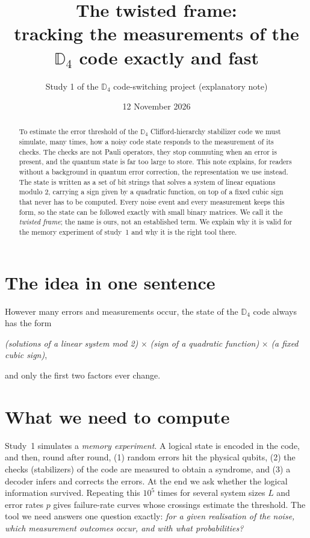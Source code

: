 \documentclass[11pt,a4paper]{article}
\title{The twisted frame:\\ tracking the measurements of the $\mathbb{D}_4$ code exactly and fast}
\author{Study 1 of the $\mathbb{D}_4$ code-switching project (explanatory note)}
\date{12 November 2026}
\begin{document}
\maketitle

\begin{abstract}
To estimate the error threshold of the $\mathbb{D}_4$ Clifford-hierarchy stabilizer code we must simulate, many times, how a noisy code state responds to the measurement of its checks. The checks are not Pauli operators, they stop commuting when an error is present, and the quantum state is far too large to store. This note explains, for readers without a background in quantum error correction, the representation we use instead. The state is written as a set of bit strings that solves a system of linear equations modulo 2, carrying a sign given by a quadratic function, on top of a fixed cubic sign that never has to be computed. Every noise event and every measurement keeps this form, so the state can be followed exactly with small binary matrices. We call it the \emph{twisted frame}; the name is ours, not an established term. We explain why it is valid for the memory experiment of study~1 and why it is the right tool there.
\end{abstract}

\section*{The idea in one sentence}
However many errors and measurements occur, the state of the $\mathbb{D}_4$ code always has the form
\begin{center}
\emph{(solutions of a linear system mod 2)} \;$\times$\; \emph{(sign of a quadratic function)} \;$\times$\; \emph{(a fixed cubic sign)},
\end{center}
and only the first two factors ever change.

\section{What we need to compute}

Study~1 simulates a \emph{memory experiment}. A logical state is encoded in the code, and then, round after round, (1) random errors hit the physical qubits, (2) the checks (stabilizers) of the code are measured to obtain a syndrome, and (3) a decoder infers and corrects the errors. At the end we ask whether the logical information survived. Repeating this $10^5$ times for several system sizes $L$ and error rates $p$ gives failure-rate curves whose crossings estimate the threshold. The tool we need answers one question exactly: \emph{for a given realisation of the noise, which measurement outcomes occur, and with what probabilities?}
\end{document}
